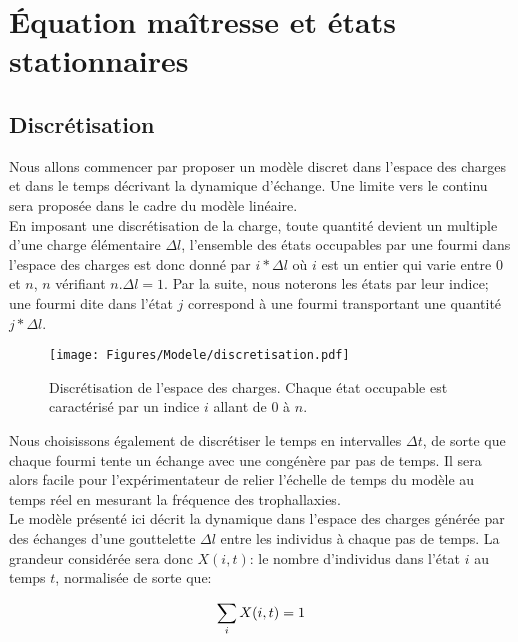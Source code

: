 \chapter{Équation maîtresse et états stationnaires}



\section{Discrétisation}

Nous allons commencer par proposer un modèle discret dans l'espace des charges et dans le temps décrivant la dynamique d'échange. Une limite vers le continu sera proposée dans le cadre du modèle linéaire.\\

En imposant une discrétisation de la charge, toute quantité devient un multiple d'une charge élémentaire $\Delta l$, l'ensemble des états occupables par une fourmi dans l'espace des charges est donc donné par $i*\Delta l$ où $i$ est un entier qui varie entre $0$ et $n$, $n$ vérifiant $n.\Delta l = 1$. Par la suite, nous noterons les états par leur indice; une fourmi dite dans l'état $j$ correspond à une fourmi transportant une quantité $j* \Delta l$.\\

\begin{figure}[h]
\centering
\texttt{[image: Figures/Modele/discretisation.pdf]}
\caption{Discrétisation de l'espace des charges. Chaque état occupable est caractérisé par un indice $i$ allant de $0$ à $n$.}
\label{discretisation}
\end{figure}

Nous choisissons également de discrétiser le temps en intervalles $\Delta t$, de sorte que chaque fourmi tente un échange avec une congénère par pas de temps. Il sera alors facile pour l'expérimentateur de relier l'échelle de temps du modèle au temps réel en mesurant la fréquence des trophallaxies.\\

Le modèle présenté ici décrit la dynamique dans l'espace des charges générée par des échanges d'une gouttelette $\Delta l$ entre les individus à chaque pas de temps. La grandeur considérée sera donc $X(i,t)$: le nombre d'individus dans l'état $i$ au temps $t$, normalisée de sorte que:

\begin{equation}
\sum_i X(i,t)=1\\
\end{equation}

